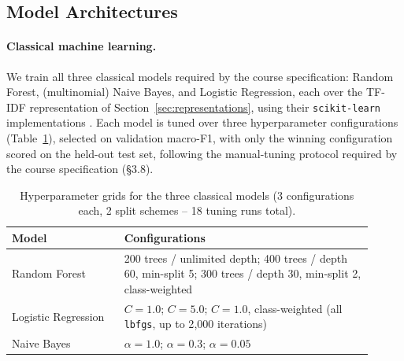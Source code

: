 \documentclass[11pt]{acl}
\begin{document}
\subsection{Model Architectures}
\label{sec:models}

\paragraph{Classical machine learning.} We train all three classical models required by
the course specification: Random Forest, (multinomial) Naive Bayes, and Logistic
Regression, each over the TF-IDF representation of Section~\ref{sec:representations},
using their \texttt{scikit-learn} implementations \cite{pedregosa-etal-2011-scikit}.
Each model is tuned over three hyperparameter configurations
(Table~\ref{tab:ml-grid}), selected on validation macro-F1, with only the winning
configuration scored on the held-out test set, following the manual-tuning protocol
required by the course specification (\S3.8).

\begin{table}[t]
\centering
\small
\begin{tabular}{@{}p{0.29\linewidth}p{0.62\linewidth}@{}}
\toprule
\textbf{Model} & \textbf{Configurations} \\
\midrule
Random Forest & 200 trees / unlimited depth; 400 trees / depth 60, min-split 5; 300
trees / depth 30, min-split 2, class-weighted \\
Logistic Regression & $C{=}1.0$; $C{=}5.0$; $C{=}1.0$, class-weighted (all
\texttt{lbfgs}, up to 2{,}000 iterations) \\
Naive Bayes & $\alpha{=}1.0$; $\alpha{=}0.3$; $\alpha{=}0.05$ \\
\bottomrule
\end{tabular}
\caption{Hyperparameter grids for the three classical models (3 configurations each,
2 split schemes -- 18 tuning runs total).}
\label{tab:ml-grid}
\end{table}
\end{document}
